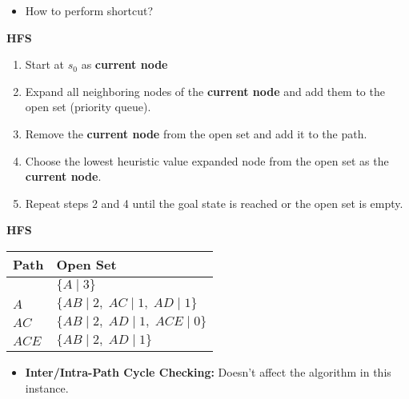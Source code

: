 \begin{warning}
    \begin{itemize}
        \item How to perform shortcut? 
    \end{itemize}
\end{warning}
\newpage

\begin{process} \textbf{HFS}
    \begin{enumerate}
        \item Start at $s_0$ as \textbf{current node}
        \item Expand all neighboring nodes of the \textbf{current node} and add them to the open set (priority queue).
        \item Remove the \textbf{current node} from the open set and add it to the path. 
        \item Choose the lowest heuristic value expanded node from the open set as the \textbf{current node}.
        \item Repeat steps 2 and 4 until the goal state is reached or the open set is empty.
    \end{enumerate}
\end{process}

\begin{example} \textbf{HFS}
    \begin{center}
        \begin{tabular}{ll}
        \toprule
        \textbf{Path} & \textbf{Open Set} \\
        \midrule
         & $\{A \mid 3\}$ \\
        $A$ & $\{AB \mid 2, \; AC \mid 1, \; AD \mid 1\}$ \\
        $AC$ & $\{AB \mid 2, \; AD \mid 1, \; ACE \mid 0\}$ \\
        $ACE$ & $\{AB \mid 2, \; AD \mid 1\}$ \\
        \bottomrule
        \end{tabular}
    \end{center}
    \begin{itemize}
        \item \textbf{Inter/Intra-Path Cycle Checking:} Doesn't affect the algorithm in this instance.
    \end{itemize}
\end{example}


